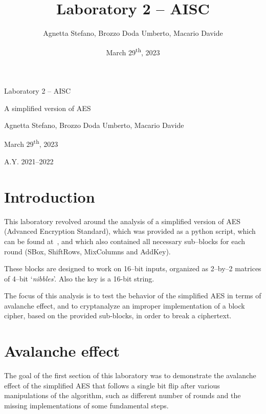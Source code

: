 \documentclass[12pt]{article}
\title{Laboratory 2 – AISC}
\author{Agnetta Stefano, Brozzo Doda Umberto, Macario Davide}
\date{March 29\textsuperscript{th}, 2023}
\newcommand\titleofdoc{Laboratory 2 – AISC} %
\newcommand\GroupName{Agnetta Stefano, Brozzo Doda Umberto, Macario Davide}
\newcommand\CurrDate{March 29\textsuperscript{th}, 2023}
\begin{document}
\begin{titlepage}
   \begin{center}
        \vspace*{4cm} %

        \Huge{\titleofdoc} 

        \vspace{0.5cm}
        \LARGE{A simplified version of AES}
            
        \vspace{3 cm}
        \Large{\GroupName\\}
       
        \vspace{4 cm}
       
        \vspace{4 cm}
        \Large{\CurrDate}
        
        \vspace{0.25 cm}
        \Large{A.Y. 2021–2022}
       
       \vfill
    \end{center}
\end{titlepage}

\section{Introduction}
\label{sec:01}

This laboratory revolved around the analysis of a simplified version of AES (Advanced Encryption Standard), which was provided as a python script, which can be found at~\cite{Original Python implementation}, and which also contained all necessary sub–blocks for each round (SBox, ShiftRows, MixColumns and AddKey).

These blocks are designed to work on 16–bit inputs, organized as 2–by–2 matrices of 4–bit `\textit{nibbles}'. Also the key is a 16-bit string.

The focus of this analysis is to test the behavior of the simplified AES in terms of avalanche effect, and to cryptanalyze an improper implementation of a block cipher, based on the provided sub-blocks, in order to break a ciphertext.

\section{Avalanche effect}
\label{sec:02}

The goal of the first section of this laboratory was to demonstrate the avalanche effect of the simplified AES that follows a single bit flip after various manipulations of the algorithm, such as different number of rounds and the missing implementations of some fundamental steps.
\end{document}
